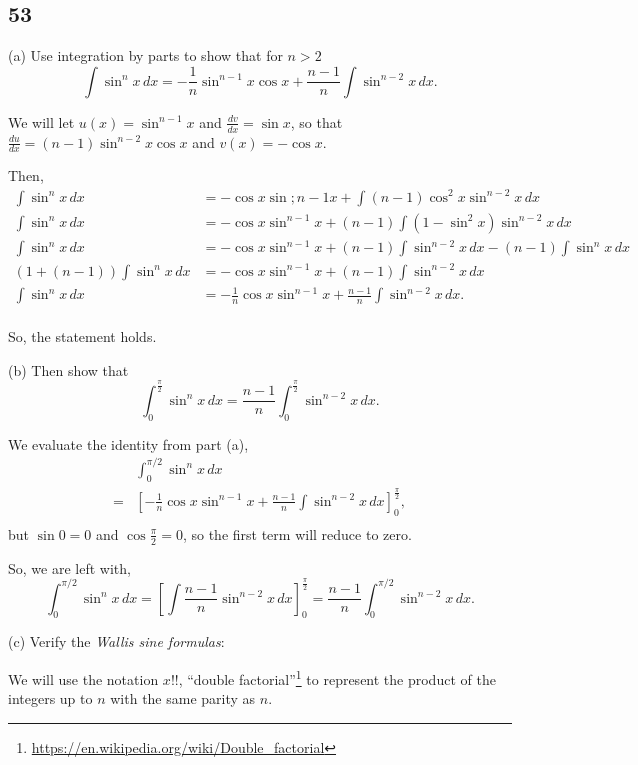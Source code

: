 \documentclass[../hw8]{subfiles}
\begin{document}
\subsection*{53}
(a) Use integration by parts to show that for $n>2$
\[\int \sin^n{x}\,dx={-\frac{1}{n}}\sin^{n-1}{x}\cos{x}+\frac{n-1}{n}\int \sin^{n-2}{x}\,dx.\]

We will let $u(x)=\sin^{n-1}{x}$ and $\frac{dv}{dx}=\sin{x}$, so that $\frac{du}{dx}=(n-1)\sin^{n-2}{x}\cos{x}$ and $v(x)={-\cos{x}}$.

Then,
\begin{align*}
    \int \sin^n{x}\,dx &= -\cos{x}\sin;{n-1}{x}+\int (n-1)\cos^2{x}\sin^{n-2}{x}\,dx \\
    \int \sin^n{x}\,dx &= -\cos{x}\sin^{n-1}{x}+(n-1)\int \left( 1-\sin^2{x} \right)\sin^{n-2}{x}\,dx \\
    \int \sin^n{x}\,dx &= -\cos{x}\sin^{n-1}{x}+(n-1)\int \sin^{n-2}{x}\,dx - (n-1)\int \sin^n{x}\,dx \\
    (1+(n-1))\int \sin^n{x}\,dx &= -\cos{x}\sin^{n-1}{x}+(n-1)\int \sin^{n-2}{x}\,dx \\
    \int \sin^n{x}\,dx &= -\frac{1}{n}\cos{x}\sin^{n-1}{x}+\frac{n-1}{n}\int \sin^{n-2}{x}\,dx. \\
\end{align*}

So, the statement holds.

(b) Then show that
\[\int_{0}^{\frac{\pi}{2}} \sin^n{x}\,dx=\frac{n-1}{n}\int_{0}^{\frac{\pi}{2}}\sin^{n-2}{x}\,dx.\]

We evaluate the identity from part (a),
\begin{align*}
    &\int_{0}^{\pi/2} \sin^n{x}\,dx \\
    =& {\left[ -\frac{1}{n}\cos{x}\sin^{n-1}{x}+\frac{n-1}{n}\int \sin^{n-2}{x}\,dx \right]}_{0}^{\frac{\pi}{2}}, \\
\end{align*}
but $\sin{0}=0$ and $\cos{\frac{\pi}{2}}=0$, so the first term will reduce to zero.

So, we are left with,
\[\int_{0}^{\pi/2} \sin^n{x}\,dx = {\left[ \int \frac{n-1}{n} \sin^{n-2}{x}\,dx \right]}_{0}^{\frac{\pi}{2}}=\frac{n-1}{n}\int_{0}^{\pi/2} \sin^{n-2}{x}\,dx.\]

(c) Verify the \textit{Wallis sine formulas}:

We will use the notation ${x!!}$, ``double factorial''\footnote{\url{https://en.wikipedia.org/wiki/Double_factorial}} to represent the product of the integers up to $n$ with the same parity as $n$.
\end{document}
